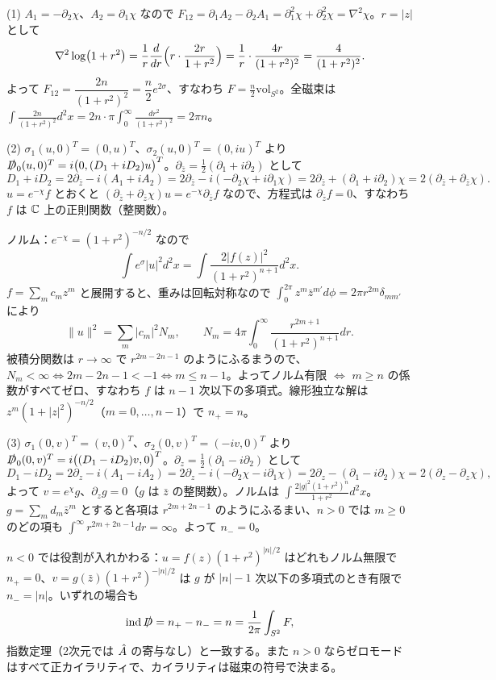 \begin{solution}
(1) $A_1=-\partial_2\chi$、$A_2=\partial_1\chi$ なので $F_{12}=\partial_1A_2-\partial_2A_1=\partial_1^2\chi+\partial_2^2\chi=\nabla^2\chi$。$r=\lvert z\rvert$ として
\[
\nabla^2\log(1+r^2)=\frac1r\frac{d}{dr}\Bigl(r\cdot\frac{2r}{1+r^2}\Bigr)=\frac1r\cdot\frac{4r}{(1+r^2)^2}=\frac{4}{(1+r^2)^2}.
\]
よって $F_{12}=\dfrac{2n}{(1+r^2)^2}=\dfrac n2e^{2\sigma}$、すなわち $F=\frac n2\mathrm{vol}_{S^2}$。全磁束は $\int\frac{2n}{(1+r^2)^2}d^2x=2n\cdot\pi\int_0^\infty\frac{dr^2}{(1+r^2)^2}=2\pi n$。

(2) $\sigma_1(u,0)^T=(0,u)^T$、$\sigma_2(u,0)^T=(0,iu)^T$ より $\slashed D_0(u,0)^T=i\bigl(0,(D_1+iD_2)u\bigr)^T$。$\partial_{\bar z}=\frac12(\partial_1+i\partial_2)$ として
\[
D_1+iD_2=2\partial_{\bar z}-i(A_1+iA_2)=2\partial_{\bar z}-i(-\partial_2\chi+i\partial_1\chi)=2\partial_{\bar z}+(\partial_1+i\partial_2)\chi=2(\partial_{\bar z}+\partial_{\bar z}\chi).
\]
$u=e^{-\chi}f$ とおくと $(\partial_{\bar z}+\partial_{\bar z}\chi)u=e^{-\chi}\partial_{\bar z}f$ なので、方程式は $\partial_{\bar z}f=0$、すなわち $f$ は $\mathbb{C}$ 上の正則関数（整関数）。

ノルム：$e^{-\chi}=(1+r^2)^{-n/2}$ なので
\[
\int e^{\sigma}\lvert u\rvert^2d^2x=\int\frac{2\lvert f(z)\rvert^2}{(1+r^2)^{n+1}}d^2x .
\]
$f=\sum_mc_mz^m$ と展開すると、重みは回転対称なので $\int_0^{2\pi}z^m\bar z^{m'}d\phi=2\pi r^{2m}\delta_{mm'}$ により
\[
\lVert u\rVert^2=\sum_m\lvert c_m\rvert^2N_m,\qquad N_m=4\pi\int_0^\infty\frac{r^{2m+1}}{(1+r^2)^{n+1}}dr .
\]
被積分関数は $r\to\infty$ で $r^{2m-2n-1}$ のようにふるまうので、$N_m<\infty\iff2m-2n-1<-1\iff m\le n-1$。よってノルム有限 $\iff$ $m\ge n$ の係数がすべてゼロ、すなわち $f$ は $n-1$ 次以下の多項式。線形独立な解は $z^m(1+\lvert z\rvert^2)^{-n/2}$（$m=0,\dots,n-1$）で $n_+=n$。

(3) $\sigma_1(0,v)^T=(v,0)^T$、$\sigma_2(0,v)^T=(-iv,0)^T$ より $\slashed D_0(0,v)^T=i\bigl((D_1-iD_2)v,0\bigr)^T$。$\partial_z=\frac12(\partial_1-i\partial_2)$ として
\[
D_1-iD_2=2\partial_z-i(A_1-iA_2)=2\partial_z-i(-\partial_2\chi-i\partial_1\chi)=2\partial_z-(\partial_1-i\partial_2)\chi=2(\partial_z-\partial_z\chi),
\]
よって $v=e^{\chi}g$、$\partial_zg=0$（$g$ は $\bar z$ の整関数）。ノルムは $\int\frac{2\lvert g\rvert^2(1+r^2)^{n}}{1+r^2}d^2x$。$g=\sum_m d_m\bar z^m$ とすると各項は $r^{2m+2n-1}$ のようにふるまい、$n>0$ では $m\ge0$ のどの項も $\int^\infty r^{2m+2n-1}dr=\infty$。よって $n_-=0$。

$n<0$ では役割が入れかわる：$u=f(z)(1+r^2)^{\lvert n\rvert/2}$ はどれもノルム無限で $n_+=0$、$v=g(\bar z)(1+r^2)^{-\lvert n\rvert/2}$ は $g$ が $\lvert n\rvert-1$ 次以下の多項式のとき有限で $n_-=\lvert n\rvert$。いずれの場合も
\[
\operatorname{ind}\slashed D=n_+-n_-=n=\frac1{2\pi}\int_{S^2}F ,
\]
指数定理（2次元では $\hat{A}$ の寄与なし）と一致する。また $n>0$ ならゼロモードはすべて正カイラリティで、カイラリティは磁束の符号で決まる。


\end{solution}
